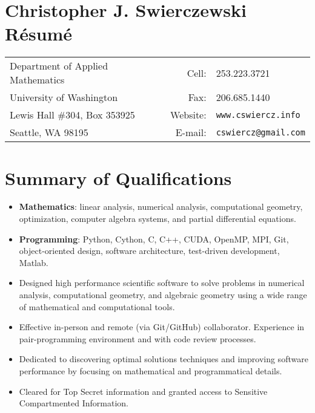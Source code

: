 \documentclass{article}
\begin{document}
\section*{Christopher J. Swierczewski \hspace{5.9cm} R\'esum\'e}

\begin{tabular}{lrl}
  Department of Applied Mathematics \hspace{5cm} & Cell:    & 253.223.3721 \\
  University of Washington          & Fax:         & 206.685.1440            \\
  Lewis Hall \#304, Box 353925      & Website:     & \tt www.cswiercz.info   \\
  Seattle, WA 98195                 & E-mail:      & \tt cswiercz@gmail.com
\end{tabular}

\section*{Summary of Qualifications}

\begin{itemize}
  \setlength{\itemsep}{0pt}
\item {\bf Mathematics}: linear analysis, numerical analysis, computational
  geometry, optimization, computer algebra systems, and partial differential
  equations.
  \item {\bf Programming}: Python, Cython, C, C++, CUDA, OpenMP, MPI, Git,
    object-oriented design, software architecture, test-driven development,
    Matlab.
  \item Designed high performance scientific software to solve problems in
    numerical analysis, computational geometry, and algebraic geometry using a
    wide range of mathematical and computational tools.
  \item Effective in-person and remote (via Git/GitHub) collaborator. Experience
    in pair-programming environment and with code review processes.
  \item Dedicated to discovering optimal solutions techniques and improving
    software performance by focusing on mathematical and programmatical details.
  \item Cleared for Top Secret information and granted access to Sensitive
    Compartmented Information.
\end{itemize}
\end{document}
